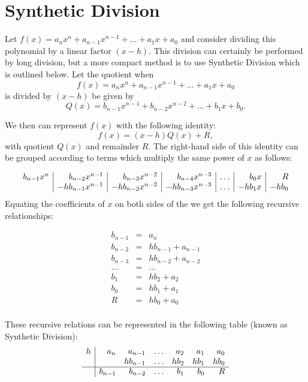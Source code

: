 \section{Synthetic Division}
Let $f(x) = a_n x^n + a_{n-1} x^{n-1} + \hdots + a_1 x + a_0$ and consider dividing this polynomial 
by a linear factor $(x-h)$. This division can certainly be performed by long division, but a more compact 
method is to use Synthetic Division which is outlined below. Let the quotient when \[f(x) = a_n x^n + a_{n-1} x^{n-1} + \hdots + a_1 x + a_0\] is divided by $(x-h)$ be given by 
\[Q(x) = b_{n-1} x^{n-1} + b_{n-2} x^{n-2} + \hdots + b_1 x + b_0.\]

We then can represent $f(x)$ with the following identity:
\[ f(x) = (x-h)Q(x) + R,\] with quotient $Q(x)$ and remainder $R$.  The right-hand side of this identity can be grouped according to terms which multiply the same power of $x$ as follows:  

\[
\begin{array}{r | r | r | r | r | r | r}
 b_{n-1} x^n & b_{n-2} x^{n-1}  &       b_{n-3} x^{n-2}     &  b_{n-4} x^{n-3}        & \hdots      & b_0 x   & R \\
               &- h b_{n-1} x^{n-1}   &   - h b_{n-2}x^{n-2}    &     - h b_{n-3}x^{n-3}  & \hdots     &  - hb_1x &  -h b_0 \\
\end{array}
\]
Equating the coefficients of $x$ on both sides of the we get the following recursive relationships:

\begin{eqnarray*}
b_{n-1}   &=& a_n \\
b_{n-2}   &=& h b_{n-1} + a_{n-1} \\
b_{n-3}   &=& h b_{n-2} + a_{n-2} \\
\hdots     &=& \hdots \\
b_1         &=& h b_2 + a_2 \\
b_0         &=& h b_1 + a_ 1\\
R             &=& h b_0 + a_0 \\
\end{eqnarray*}

These recursive relations can be represented in the following table (known as Synthetic Division):
\[
\begin{array}{r|rrrrrr}
h & a_n & a_{n-1} & \hdots & a_2 &  a_1 & a_0 \\
  & & h b_{n-1}     & \hdots & h b_2 &h b_1 & h b_0 \\
\cline{1-7}
 & b_{n-1} & b_{n-2} & \hdots & b_1 & b_0 & R
\end{array}
\]

